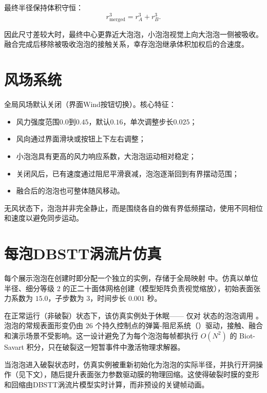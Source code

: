 最终半径保持体积守恒：
\[
r_{\mathrm{merged}}^3 = r_A^3 + r_B^3.
\]

因此尺寸差较大时，最终中心更靠近大泡泡，小泡泡视觉上向大泡泡一侧被吸收。融合完成后移除被吸收泡泡的接触关系，幸存泡泡继承体积加权后的合速度。


\section{风场系统}

全局风场默认关闭（界面Wind按钮切换）。核心特征：

\begin{itemize}
  \item 风力强度范围$0.0$到$0.45$，默认$0.16$，单次调整步长$0.025$；
  \item 风向通过界面滑块或按钮上下左右调整；
  \item 小泡泡具有更高的风力响应系数，大泡泡运动相对稳定；
  \item 关闭风后，已有速度通过阻尼平滑衰减，泡泡逐渐回到有界摆动范围；
  \item 融合后的泡泡也可整体随风移动。
\end{itemize}

无风状态下，泡泡并非完全静止，而是围绕各自的做有界低频摆动，使用不同相位和速度以避免同步运动。

\section{每泡DBSTT涡流片仿真}

每个展示泡泡在创建时即分配一个独立的实例，存储于全局映射  中。仿真以单位半径、细分等级 $2$ 的正二十面体网格创建（模型矩阵负责视觉缩放），初始表面张力系数为 $15.0$，子步数为 $3$，时间步长 $0.001$ 秒。

在正常运行（非破裂）状态下，该仿真实例处于休眠—— 仅对  状态的泡泡调用 。泡泡的常规表面形变仍由 $26$ 个持久控制点的弹簧-阻尼系统（）驱动，接触、融合和演示场景不受影响。这一设计避免了为每个泡泡每帧都执行 $O(N^2)$ 的 Biot-Savart 积分，只在破裂这一短暂事件中激活物理求解器。

当泡泡进入破裂状态时，仿真实例被重新初始化为泡泡的实际半径，并执行开洞操作（见下文），随后提升表面张力参数驱动膜的物理回缩。这使得破裂时膜的变形和回缩由DBSTT涡流片模型\cite{da2015doublebubbles}实时计算，而非预设的关键帧动画。


